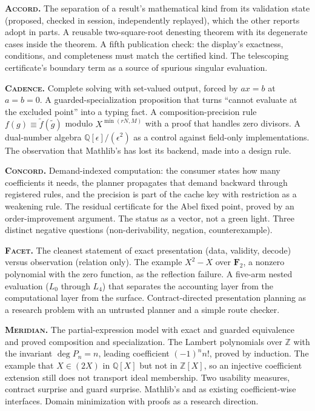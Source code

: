 \documentclass[11pt,a4paper]{article}
\newcommand{\code}[1]{\texttt{\detokenize{#1}}}
\newcommand{\Ac}{\textsc{Accord}}
\newcommand{\Cd}{\textsc{Cadence}}
\newcommand{\Cc}{\textsc{Concord}}
\newcommand{\Fc}{\textsc{Facet}}
\newcommand{\Md}{\textsc{Meridian}}
\newcommand{\Z}{\mathbb Z}
\newcommand{\Q}{\mathbb Q}
\theoremstyle{definition}
\begin{document}
\textbf{\Ac.} The separation of a result's mathematical kind from its validation state (proposed, checked in session, independently replayed), which the other reports adopt in parts. A reusable two-square-root denesting theorem with its degenerate cases inside the theorem. A fifth publication check: the display's exactness, conditions, and completeness must match the certified kind. The telescoping certificate's boundary term as a source of spurious singular evaluation.

\textbf{\Cd.} Complete solving with set-valued output, forced by $ax=b$ at $a=b=0$. A guarded-specialization proposition that turns ``cannot evaluate at the excluded point'' into a typing fact. A composition-precision rule $f(g)\equiv\tilde f(\tilde g)$ modulo $X^{\min(rN,M)}$ with a proof that handles zero divisors. A dual-number algebra $\Q[\epsilon]/(\epsilon^2)$ as a control against field-only implementations. The observation that Mathlib's \code{polyrith} has lost its backend, made into a design rule.

\textbf{\Cc.} Demand-indexed computation: the consumer states how many coefficients it needs, the planner propagates that demand backward through registered rules, and the precision is part of the cache key with restriction as a weakening rule. The residual certificate for the Abel fixed point, proved by an order-improvement argument. The status as a vector, not a green light. Three distinct negative questions (non-derivability, negation, counterexample).

\textbf{\Fc.} The cleanest statement of exact presentation (data, validity, decode) versus observation (relation only). The example $X^2-X$ over $\mathbf F_2$, a nonzero polynomial with the zero function, as the reflection failure. A five-arm nested evaluation ($L_0$ through $L_4$) that separates the accounting layer from the computational layer from the surface. Contract-directed presentation planning as a research problem with an untrusted planner and a simple route checker.

\textbf{\Md.} The partial-expression model with exact and guarded equivalence and proved composition and specialization. The Lambert polynomials over $\Z$ with the invariant $\deg P_n=n$, leading coefficient $(-1)^n n!$, proved by induction. The example that $X\in(2X)$ in $\Q[X]$ but not in $\Z[X]$, so an injective coefficient extension still does not transport ideal membership. Two usability measures, contract surprise and guard surprise. Mathlib's \code{match_scalars} and \code{module} as existing coefficient-wise interfaces. Domain minimization with proofs as a research direction.
\end{document}
